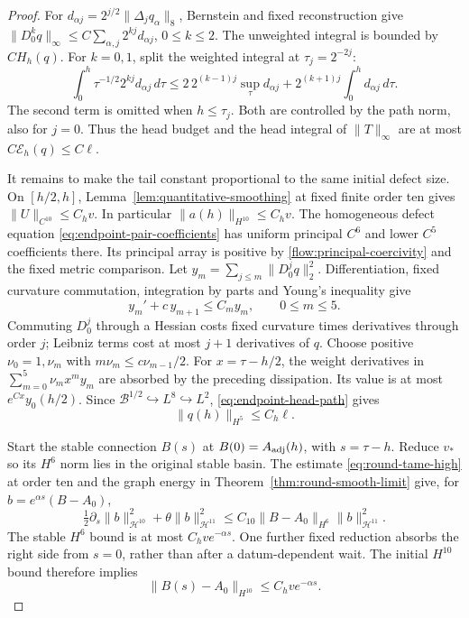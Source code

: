 \documentclass[11pt]{article}
\numberwithin{equation}{section}
\theoremstyle{definition}
\theoremstyle{remark}
\begin{document}
\begin{proof}
For \(d_{\alpha j}=2^{j/2}\|\Delta_jq_\alpha\|_8\),
Bernstein and fixed reconstruction give
\(\|D_0^kq\|_\infty\le C\sum_{\alpha,j}2^{kj}d_{\alpha j}\),
\(0\le k\le2\). The unweighted integral is bounded
by \(CH_h(q)\). For \(k=0,1\), split the weighted
integral at \(\tau_j=2^{-2j}\):
\[
 \int_0^h\tau^{-1/2}2^{kj}d_{\alpha j}\,d\tau
 \le 2\,2^{(k-1)j}\sup_\tau d_{\alpha j}
             +2^{(k+1)j}\int_0^h d_{\alpha j}\,d\tau .
\]
The second term is omitted when \(h\le\tau_j\).
Both are controlled by the path norm, also for \(j=0\).
Thus the head budget and the head integral of \(\|T\|_\infty\)
are at most \(C\mathcal E_h(q)\le C\ell\).

It remains to make the tail constant proportional to
the same initial defect size. On \([h/2,h]\),
Lemma~\ref{lem:quantitative-smoothing} at fixed finite
order ten gives \(\|U\|_{C^{10}}\le C_hv\).
In particular \(\|a(h)\|_{H^{10}}\le C_hv\).
The homogeneous defect equation
\eqref{eq:endpoint-pair-coefficients} has uniform
principal \(C^6\) and lower \(C^5\) coefficients there.
Its principal array is positive by
\eqref{flow:principal-coercivity} and the fixed metric
comparison. Let \(y_m=\sum_{j\le m}\|D_0^jq\|_2^2\).
Differentiation, fixed curvature commutation, integration
by parts and Young's inequality give
\[
                   y_m'+c\,y_{m+1}\le C_my_m,\qquad 0\le m\le5.
\]
Commuting \(D_0^j\) through a Hessian costs fixed
curvature times derivatives through order \(j\);
Leibniz terms cost at most \(j+1\) derivatives of \(q\).
Choose positive \(\nu_0=1,\nu_m\) with
\(m\nu_m\le c\nu_{m-1}/2\). For \(x=\tau-h/2\),
the weight derivatives in \(\sum_{m=0}^5\nu_mx^my_m\)
are absorbed by the preceding dissipation. Its value
is at most \(e^{Cx}y_0(h/2)\).
Since \(\mathcal B^{1/2}\hookrightarrow L^8\hookrightarrow L^2\),
\eqref{eq:endpoint-head-path} gives
\begin{equation}\label{eq:endpoint-splice-defect}
                         \|q(h)\|_{H^5}\le C_h\ell .
\end{equation}

Start the stable connection \(B(s)\) at
\(B(0)=A_{\rm adj}(h)\), with \(s=\tau-h\).
Reduce \(v_*\) so its \(H^6\) norm lies in the original
stable basin. The estimate
\eqref{eq:round-tame-high} at order ten and the graph
energy in Theorem~\ref{thm:round-smooth-limit} give,
for \(b=e^{\alpha s}(B-A_0)\),
\[
 \tfrac12\partial_s\|b\|_{\mathcal H^{10}}^2
 +\theta\|b\|_{\mathcal H^{11}}^2
 \le C_{10}\|B-A_0\|_{H^6}\|b\|_{\mathcal H^{11}}^2 .
\]
The stable \(H^6\) bound is at most \(C_hv e^{-\alpha s}\).
One further fixed reduction absorbs the right side
from \(s=0\), rather than after a datum-dependent wait.
The initial \(H^{10}\) bound therefore implies
\[
                  \|B(s)-A_0\|_{H^{10}}\le C_hv e^{-\alpha s}.
\]


\end{proof}
\end{document}
